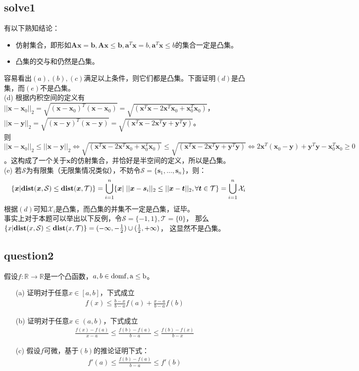 \documentclass[12pt,a4paper]{ctexart}
\newcommand{\bs}[1]{\boldsymbol{#1}}
\newcommand{\R}{\mathbb{R}}
\begin{document}
\subsection*{solve1}
有以下熟知结论：
\begin{itemize}
\item 仿射集合，即形如$\bs{A}\bs{x}=\bs{b},\bs{A}\bs{x}\leq \bs{b},\bs{a}^T\bs{x}=b,\bs{a}^T\bs{x}\leq b$的集合一定是凸集。
\item 凸集的交与和仍然是凸集。
\end{itemize}
容易看出$(a),(b),(c)$满足以上条件，则它们都是凸集。下面证明$(d)$是凸集，而$(e)$不是凸集。\\
(d) 根据内积空间的定义有
$||\bs{x}-\bs{x}_0||_2=\sqrt{(\bs{x}-\bs{x}_0)^T(\bs{x}-\bs{x}_0)}=\sqrt{(\bs{x}^T\bs{x}-2\bs{x}^T\bs{x}_0+\bs{x}_0^T\bs{x}_0)}$，
$||\bs{x}-\bs{y}||_2=\sqrt{(\bs{x}-\bs{y})^T(\bs{x}-\bs{y})}=\sqrt{(\bs{x}^T\bs{x}-2\bs{x}^T\bs{y}+\bs{y}^T\bs{y})}$。\\
则$||\bs{x}-\bs{x}_0||_2 \leq ||\bs{x}-\bs{y}||_2 \Leftrightarrow \sqrt{(\bs{x}^T\bs{x}-2\bs{x}^T\bs{x}_0+\bs{x}_0^T\bs{x}_0)} \leq \sqrt{(\bs{x}^T\bs{x}-2\bs{x}^T\bs{y}+\bs{y}^T\bs{y})}
\Leftrightarrow 2\bs{x}^T(\bs{x}_0-\bs{y})+\bs{y}^T\bs{y}-\bs{x}_0^T\bs{x}_0 \geq 0$。这构成了一个关于$\bs{x}$的仿射集合，并恰好是半空间的定义，所以是凸集。\\
(e)
若$\mathcal{S}$为有限集（无限集情况类似），不妨令$\mathcal{S}=\{\bs{s}_1,\ldots,\bs{s}_n\}$，则：
\begin{align*}
    \{\bs{x}|\bs{\rm{dist}}(\bs{x},\mathcal{S})\leq \bs{\rm{dist}}(\bs{x},\mathcal{T})\}
    =\bigcup\limits_{i=1}^{n} \{\bs{x}|\ ||\bs{x}-\bs{s}_i||_2 \leq ||\bs{x}-\bs{t}||_2,\forall \bs{t} \in \mathcal{T}\}
    =\bigcup\limits_{i=1}^{n} \mathcal{X}_i
\end{align*}
根据$(d)$可知$\mathcal{X}_i$是凸集，而凸集的并集不一定是凸集，证毕。\\
事实上对于本题可以举出以下反例，令$\mathcal{S}=\{-1,1\},\mathcal{T}=\{0\}$，
那么$\{x|\bs{\rm{dist}}(x,\mathcal{S})\leq \bs{\rm{dist}}(x,\mathcal{T})\}=(-\infty,-\frac{1}{2}) \cup (\frac{1}{2},+\infty)$，
这显然不是凸集。
\subsection*{question2}
假设$f:\R \rightarrow \R$是一个凸函数，$a,b \in \rm{domf},a\leq b$。
\begin{itemize}
    \item[(a)] 证明对于任意$x\in[a,b]$，下式成立
    \begin{align*}
    f(x)\leq \frac{b-x}{b-a}f(a)+\frac{x-a}{b-a}f(b)
    \end{align*}
    \item[(b)] 证明对于任意$x\in(a,b)$，下式成立
    \begin{align*}
    \frac{f(x)-f(a)}{x-a} \leq \frac{f(b)-f(a)}{b-a}\leq \frac{f(b)-f(x)}{b-x}
    \end{align*}
    \item[(c)] 假设$f$可微，基于$(b)$的推论证明下式：
    \begin{align*}
    f'(a)\leq \frac{f(b)-f(a)}{b-a} \leq f'(b)
    \end{align*} 
\end{itemize}
\end{document}
